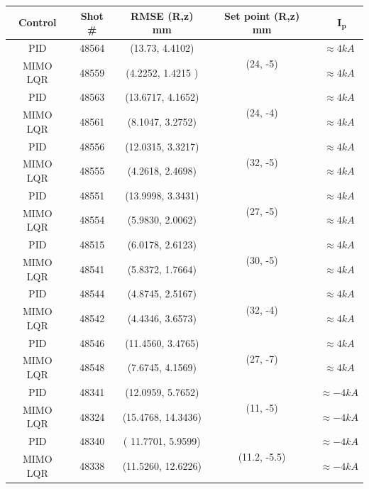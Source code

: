 \begin{center}
	\begin{longtable}{||c| c| c| c|c||} 
		\hline
		\rowcolor{color2}
		\textbf{Control} &  \textbf{Shot \#} &\textbf{RMSE (R,z) mm} & \textbf{ Set point (R,z) mm} &\ $\mathbf{I_p}$ \\ [0.5ex] 
		\hline\hline
		PID & 48564 &  (13.73, 4.4102) & \multirow{ 2}{*}{(24, -5)}&  $\approx 4 kA$ \\ 
		\cline{1-3} \cline{5-5}
		MIMO LQR & 48559 & (4.2252, 1.4215 ) & &  $\approx 4 kA$	\\
		\hline
		PID & 48563 & (13.6717,	4.1652)  & \multirow{ 2}{*}{(24, -4)}& $\approx 4 kA$ \\ 
		\cline{1-3} \cline{5-5}
		MIMO LQR & 48561 & (8.1047,	3.2752) & & $\approx 4 kA$ \\
		\hline
		PID & 48556 & (12.0315,	3.3217)  & \multirow{ 2}{*}{(32, -5)}& $\approx 4 kA$  \\ 
		\cline{1-3} \cline{5-5}
		MIMO LQR & 48555 & (4.2618, 2.4698) &  &  $\approx 4 kA$ \\
		\hline
		PID & 48551 & (13.9998,	3.3431)  & \multirow{ 2}{*}{(27, -5)} &  $\approx 4 kA$ \\ 
		\cline{1-3} \cline{5-5}
		MIMO LQR & 48554 & (5.9830, 2.0062)  &  &  $\approx 4 kA$ \\
		\hline
		PID & 48515 & (6.0178,	2.6123)  & \multirow{ 2}{*}{(30, -5)} & $\approx 4 kA$ \\ 
		\cline{1-3} \cline{5-5}
		MIMO LQR & 48541 & (5.8372,	1.7664) &  &  $\approx 4 kA$\\
		\hline
		PID & 48544 & (4.8745,	2.5167)  & \multirow{ 2}{*}{(32, -4)}& $\approx 4 kA$ \\ 
		\cline{1-3} \cline{5-5}
		MIMO LQR & 48542 & (4.4346,	3.6573) & &  $\approx 4 kA$ \\
		\hline
		PID & 48546 & (11.4560, 3.4765)  & \multirow{ 2}{*}{(27, -7)}&   $\approx 4 kA$\\ 
		\cline{1-3} \cline{5-5}
		MIMO LQR & 48548 & (7.6745, 4.1569) & &  $\approx 4 kA$ \\
		\hline
		PID & 48341 & (12.0959,	5.7652)  & \multirow{ 2}{*}{(11, -5)}& $\approx -4 kA$\\ 
		\cline{1-3} \cline{5-5}
		MIMO LQR & 48324 &  (15.4768,	14.3436)& & $\approx -4 kA$ \\
		\hline
		PID & 48340 & ( 11.7701, 5.9599) & \multirow{ 2}{*}{(11.2, -5.5)}&  $\approx -4 kA$\\ 
		\cline{1-3} \cline{5-5}
		MIMO LQR & 48338 & (11.5260,	12.6226) &  &  $\approx -4 kA$\\

\end{longtable}
\end{center}
